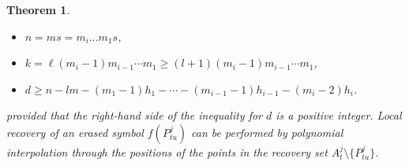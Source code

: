 \documentclass{amsart}
\newtheorem{thm}{Theorem}[section]
\theoremstyle{definition}
\begin{document}
\begin{thm}
\begin{itemize}
 \item $n= ms=m_{i}\ldots m_1s$,
 \item $k= \ell(m_{i}-1)m_{i-1}\cdots m_1\geq (l+1)(m_{i}-1)m_{i-1}\cdots m_1$,
 \item $d\geq n-lm-(m_1-1)h_1-\cdots-(m_{i-1}-1)h_{i-1}-(m_{i}-2)h_{i}$.
\end{itemize}
provided that the right-hand side of the inequality for $d$ is a positive integer. Local recovery of an erased symbol $f (P_{tu}^{j})$ can be performed by polynomial interpolation through the positions of the points in the recovery set $A_t^j\setminus\{P_{tu}^j\}$.


\end{thm}
\end{document}
